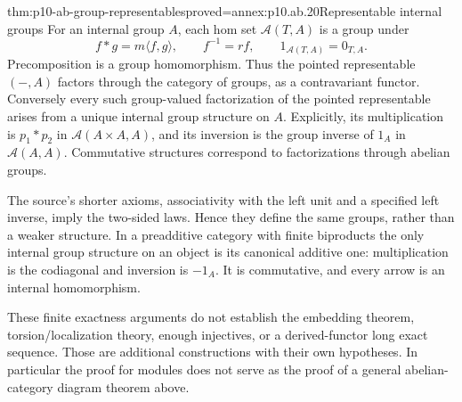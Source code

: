 \begin{hbtheorem}{thm:p10-ab-group-representables}{proved=annex:p10.ab.20}{Representable internal groups}
For an internal group \(A\), each hom set \(\mathcal A(T,A)\)
is a group under
\[
 f*g=m\langle f,g\rangle,\qquad f^{-1}=rf,
 \qquad 1_{\mathcal A(T,A)}=0_{T,A}.
\]
Precomposition is a group homomorphism. Thus the pointed representable
\((- ,A)\) factors through the category of groups, as a contravariant
functor. Conversely every such group-valued factorization of the pointed
representable arises from a unique internal group structure on \(A\).
Explicitly, its multiplication is \(p_1*p_2\) in
\(\mathcal A(A\times A,A)\), and its inversion is the group inverse
of \(1_A\) in \(\mathcal A(A,A)\). Commutative structures correspond
to factorizations through abelian groups.

The source's shorter axioms, associativity with the left unit and a
specified left inverse, imply the two-sided laws. Hence they define the
same groups, rather than a weaker structure. In a preadditive category
with finite biproducts the only internal group structure on an object
is its canonical additive one: multiplication is the codiagonal and
inversion is \(-1_A\). It is commutative, and every arrow is an
internal homomorphism.
\end{hbtheorem}


These finite exactness arguments do not establish the embedding theorem,
torsion/localization theory, enough injectives, or a derived-functor long
exact sequence. Those are additional constructions with their own hypotheses.
In particular the proof for modules does not serve as the proof of a
general abelian-category diagram theorem above.
